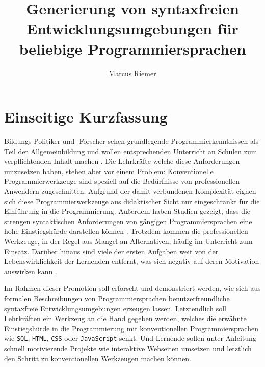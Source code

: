 \documentclass[paper=a4,fontsize=11pt,parskip=half]{scrartcl}
\title{Generierung von syntaxfreien Entwicklungsumgebungen für beliebige Programmiersprachen}
\author{Marcus Riemer}
\begin{document}
\pagestyle{empty}

\maketitle
\tableofcontents

\clearpage
{}
\section{Einseitige Kurzfassung}

Bildungs-Politiker und -Forscher sehen grundlegende Programmierkenntnissen als Teil der Allgemeinbildung und wollen entsprechenden Unterricht an Schulen zum verpflichtenden Inhalt machen \cite{noauthor_designierte_2018}. Die Lehrkräfte welche diese Anforderungen umzusetzen haben, stehen aber vor einem Problem: Konventionelle Programmierwerkzeuge sind speziell auf die Bedürfnisse von professionellen Anwendern zugeschnitten. Aufgrund der damit verbundenen Komplexität eignen sich diese Programmierwerkzeuge aus didaktischer Sicht nur eingeschränkt für die Einführung in die Programmierung. Außerdem haben Studien gezeigt, dass die strengen syntaktischen Anforderungen von gängigen Programmiersprachen eine hohe Einstiegshürde darstellen können \cite{resnick_scratch:_2009}. Trotzdem kommen die professionellen Werkzeuge, in der Regel aus Mangel an Alternativen, häufig im Unterricht zum Einsatz. Darüber hinaus sind viele der ersten Aufgaben weit von der Lebenswirklichkeit der Lernenden entfernt, was sich negativ auf deren Motivation auswirken kann \cite{resnick_scratch:_2009}.

Im Rahmen dieser Promotion soll erforscht und demonstriert werden, wie sich aus formalen Beschreibungen von Programmiersprachen benutzerfreundliche syntaxfreie Entwicklungsumgebungen erzeugen lassen. Letztendlich soll Lehrkräften ein Werkzeug an die Hand gegeben werden, welches die erwähnte Einstiegshürde in die Programmierung mit konventionellen Programmiersprachen wie \texttt{SQL}, \texttt{HTML}, \texttt{CSS} oder \texttt{JavaScript} senkt. Und Lernende sollen unter Anleitung schnell motivierende Projekte wie interaktive Webseiten umsetzen und letztlich den Schritt zu konventionellen Werkzeugen machen können.
\end{document}
